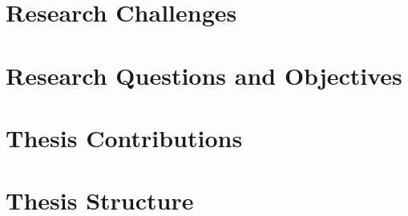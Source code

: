 \section{Research Challenges}

\section{Research Questions and Objectives}

\section{Thesis Contributions}

\section{Thesis Structure}